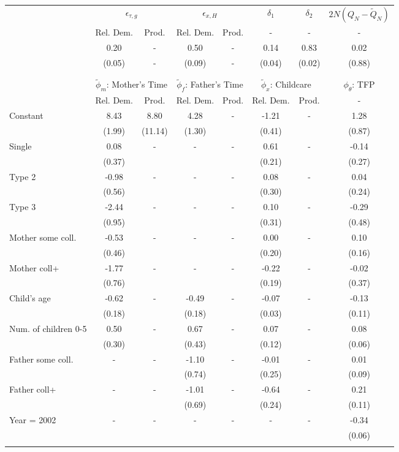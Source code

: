 \begin{tabular}{lccccccc}\toprule
 & \multicolumn{2}{c}{$\epsilon_{\tau,g}$} & \multicolumn{2}{c}{$\epsilon_{x,H}$} & {$\delta_{1}$} & {$\delta_{2}$} & $2N(Q_{N} - \tilde{Q}_{N})$ \\
 & Rel. Dem. & Prod. & Rel. Dem. & Prod. & - & - & - \\\cmidrule(r){2-3}\cmidrule(r){4-5}\cmidrule(r){6-6}\cmidrule(r){7-7}\cmidrule(r){8-8}
&0.20& - &0.50& - &0.14&0.83&0.02\\
&(0.05)& - &(0.09)& - &(0.04)&(0.02)&(0.88)\\
\\
&&&&&&&\\
 & \multicolumn{2}{c}{$\tilde{\phi}_{m}$: Mother's Time} & \multicolumn{2}{c}{$\tilde{\phi}_{f}$: Father's Time} & \multicolumn{2}{c}{$\tilde{\phi}_{x}$: Childcare} &{$\phi_{\theta}$: TFP} \\
 & Rel. Dem. & Prod. & Rel. Dem. & Prod. & Rel. Dem. & Prod. & -  \\\cmidrule(r){2-3}\cmidrule(r){4-5}\cmidrule(r){6-7}\cmidrule(r){8-8}
Constant&8.43&8.80&4.28& -&-1.21& -&1.28\\
&(1.99)&(11.14)&(1.30)&&(0.41)&&(0.87)\\
Single&0.08& -& - & -&0.61& -&-0.14\\
&(0.37)& & &&(0.21)&&(0.27)\\
Type 2&-0.98& -& - & -&0.08& -&0.04\\
&(0.56)& & &&(0.30)&&(0.24)\\
Type 3&-2.44& -& - & -&0.10& -&-0.29\\
&(0.95)& & &&(0.31)&&(0.48)\\
Mother some coll.&-0.53& -& - & -&0.00& -&0.10\\
&(0.46)& & &&(0.20)&&(0.16)\\
Mother coll+&-1.77& -& - & -&-0.22& -&-0.02\\
&(0.76)& & &&(0.19)&&(0.37)\\
Child's age&-0.62& -&-0.49& -&-0.07& -&-0.13\\
&(0.18)&&(0.18)&&(0.03)&&(0.11)\\
Num. of children 0-5&0.50& -&0.67& -&0.07& -&0.08\\
&(0.30)&&(0.43)&&(0.12)&&(0.06)\\
Father some coll.& - & -&-1.10& -&-0.01& -&0.01\\
 & &&(0.74)&&(0.25)&&(0.09)\\
Father coll+& - & -&-1.01& -&-0.64& -&0.21\\
 & &&(0.69)&&(0.24)&&(0.11)\\
Year = 2002& - & -& - & -& - & -&-0.34\\
 & & & & & &&(0.06)\\
\\
\bottomrule\end{tabular}